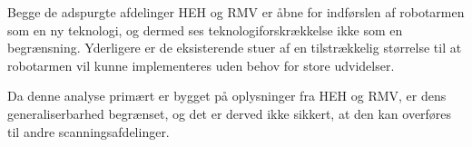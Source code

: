 Begge de adspurgte afdelinger HEH og RMV er åbne for indførslen af robotarmen som en ny teknologi, og dermed ses teknologiforskrækkelse ikke som en begrænsning. Yderligere er de eksisterende stuer af en tilstrækkelig størrelse til at robotarmen vil kunne implementeres uden behov for store udvidelser. 

Da denne analyse primært er bygget på oplysninger fra HEH og RMV, er dens generaliserbarhed begrænset, og det er derved ikke sikkert, at den kan overføres til andre scanningsafdelinger. 